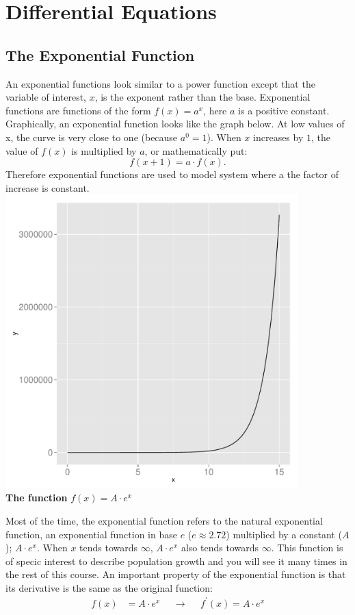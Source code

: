 \documentclass[a4paper]{report}
\begin{document}

\section{Differential Equations}

\subsection{The Exponential Function}

An exponential functions look similar to a power function except that the variable of interest, $x$, is the exponent rather than the base. Exponential functions are functions of the form $f(x)=a^x$, here $a$ is a positive constant. Graphically, an exponential function looks like the graph below. At low values of x, the curve is very close to one (because $a^0=1$). When $x$ increases by $1$, the value of $f(x)$ is multiplied by $a$, or mathematically put:
\begin{equation}
f(x+1) = a \cdot f(x).
\end{equation}
Therefore exponential functions are used to model system where a the factor of increase is constant.\\ 
\includegraphics[width=0.85\textwidth]{exponential_plot.pdf}\\


\textbf{The function} $f(x) = A \cdot e^x$


Most of the time, the exponential function refers to the natural exponential function, an exponential function in base $e$ ($e \approx 2.72$) multiplied by a constant ($A$); $A \cdot e^x$. When $x$ tends towards $\infty$, $A \cdot e^x$ also tends towards $\infty$. This function is of specic interest to describe population growth and you will see it many times in the rest of this course. An important property of the exponential function is that its derivative is the same as the original function:
\begin{align}
f(x)& = A \cdot e^x & &\rightarrow& & f^\prime(x) =  A \cdot e^x  
\end{align}
\end{document}
